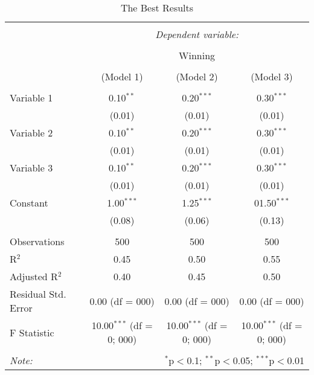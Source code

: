 \begin{landscape} 
	\vspace*{\fill}
	\thispagestyle{empty}
	\begin{table}[!htbp] \centering 
		\caption{The Best Results} 
		\label{table} 
		\begin{tabular}{@{\extracolsep{2pt}}lccc} 
			\\[-1.8ex]\hline 
			\hline \\[-1.8ex] 
			& \multicolumn{3}{c}{\textit{Dependent variable:}} \\ 
			\cline{2-4} 
			\\[-1.8ex] & \multicolumn{3}{c}{Winning} \\ 
			\\[-1.8ex] & (Model 1) & (Model 2) & (Model 3)\\ 
			\hline \\[-1.8ex] 
			Variable 1 & 0.10$^{**}$ & 0.20$^{***}$ & 0.30$^{***}$ \\ 
			& (0.01) & (0.01) & (0.01) \\
			Variable 2 & 0.10$^{**}$ & 0.20$^{***}$ & 0.30$^{***}$ \\  
			& (0.01) & (0.01) & (0.01) \\
			Variable 3 & 0.10$^{**}$ & 0.20$^{***}$ & 0.30$^{***}$ \\  
			& (0.01) & (0.01) & (0.01) \\ 
			Constant & 1.00$^{***}$ & 1.25$^{***}$ & 01.50$^{***}$ \\ 
			& (0.08) & (0.06) & (0.13) \\ 
			\hline \\[-1.8ex] 
			Observations & 500 & 500 & 500 \\ 
			R$^{2}$ & 0.45 & 0.50 & 0.55 \\ 
			Adjusted R$^{2}$ & 0.40 & 0.45 & 0.50 \\ 
			Residual Std. Error & 0.00 (df = 000) & 0.00 (df = 000) & 0.00 (df = 000) \\ 
			F Statistic & 10.00$^{***}$ (df = 0; 000) & 10.00$^{***}$ (df = 0; 000) & 10.00$^{***}$ (df = 0; 000) \\ 
			\hline 
			\hline \\[-1.8ex] 
			\textit{Note:}  & \multicolumn{3}{r}{$^{*}$p$<$0.1; $^{**}$p$<$0.05; $^{***}$p$<$0.01} \\ 
		\end{tabular} 
	\end{table}
	\vfill
	\raisebox{-.5in}{\makebox[\linewidth]{\thepage}}
\end{landscape}	
